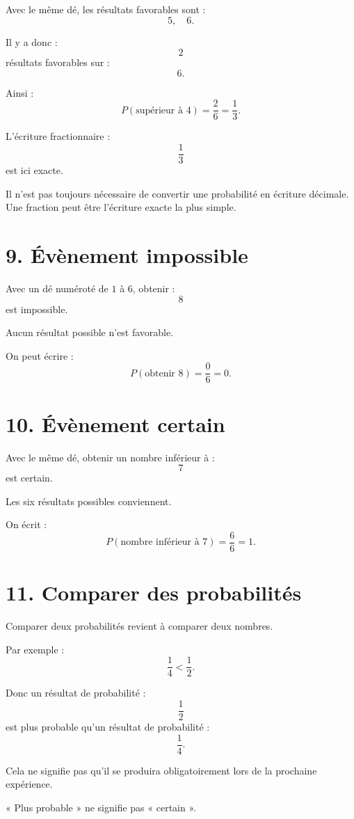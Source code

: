 Avec le même dé, les résultats favorables sont :
\[
5,\quad6.
\]

Il y a donc :
\[
2
\]
résultats favorables sur :
\[
6.
\]

Ainsi :
\[
P(\text{supérieur à }4)=\dfrac26=\dfrac13.
\]

L'écriture fractionnaire :
\[
\dfrac13
\]
est ici exacte.

\begin{remarque}
Il n'est pas toujours nécessaire de convertir une probabilité en écriture décimale. Une fraction peut être l'écriture exacte la plus simple.
\end{remarque}

\section{9. Évènement impossible}

Avec un dé numéroté de $1$ à $6$, obtenir :
\[
8
\]
est impossible.

Aucun résultat possible n'est favorable.

On peut écrire :
\[
P(\text{obtenir }8)=\dfrac06=0.
\]

\section{10. Évènement certain}

Avec le même dé, obtenir un nombre inférieur à :
\[
7
\]
est certain.

Les six résultats possibles conviennent.

On écrit :
\[
P(\text{nombre inférieur à }7)=\dfrac66=1.
\]

\section{11. Comparer des probabilités}

Comparer deux probabilités revient à comparer deux nombres.

Par exemple :
\[
\dfrac14<\dfrac12.
\]

Donc un résultat de probabilité :
\[
\dfrac12
\]
est plus probable qu'un résultat de probabilité :
\[
\dfrac14.
\]

Cela ne signifie pas qu'il se produira obligatoirement lors de la prochaine expérience.

\begin{attention}
« Plus probable » ne signifie pas « certain ».
\end{attention}

